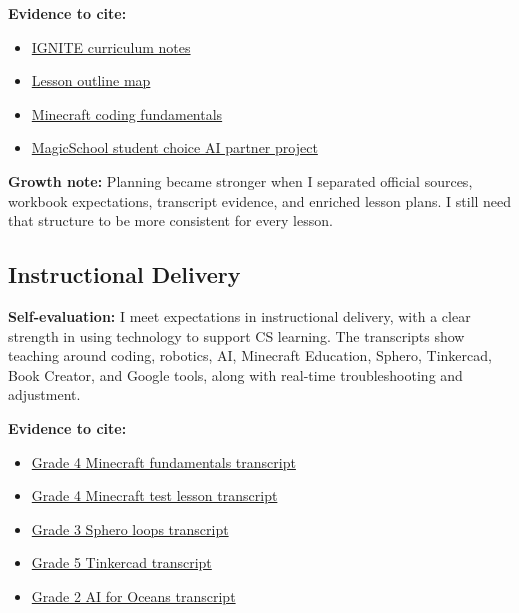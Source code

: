 \documentclass[10pt]{article}
\newcommand{\doclink}[2]{\href{run:#1}{#2}}
\begin{document}
\textbf{Evidence to cite:}
\begin{itemize}[leftmargin=*]
  \item \doclink{../../pine-brook-elementary/teaching-placement-ignite-curriculum-gcsd-25-26/teaching-placement-ignite-curriculum-gcsd-25-26-notes.md}{IGNITE curriculum notes}
  \item \doclink{../../pine-brook-elementary/lessons/lesson-outline-notes.md}{Lesson outline map}
  \item \doclink{../../pine-brook-elementary/lessons/grade-4-baris-fowler-schrank-autore/minecraft-coding-fundamentals/minecraft-coding-fundamentals.md}{Minecraft coding fundamentals}
  \item \doclink{../../pine-brook-elementary/lessons/grade-3-lamanaco-lallucci-regelsberger-tandoi/magicschool-student-choice-ai-partner-project/magicschool-student-choice-ai-partner-project.md}{MagicSchool student choice AI partner project}
\end{itemize}

\textbf{Growth note:} Planning became stronger when I separated official sources, workbook expectations, transcript evidence, and enriched lesson plans. I still need that structure to be more consistent for every lesson.

\subsection{Instructional Delivery}

\textbf{Self-evaluation:} I meet expectations in instructional delivery, with a clear strength in using technology to support CS learning. The transcripts show teaching around coding, robotics, AI, Minecraft Education, Sphero, Tinkercad, Book Creator, and Google tools, along with real-time troubleshooting and adjustment.

\textbf{Evidence to cite:}
\begin{itemize}[leftmargin=*]
  \item \doclink{../../transcripts/grade-4/260313-grade-4-baris-minecraft-fundamentals.md}{Grade 4 Minecraft fundamentals transcript}
  \item \doclink{../../transcripts/grade-4/260302-grade-4-baris-minecraft-test.md}{Grade 4 Minecraft test lesson transcript}
  \item \doclink{../../transcripts/grade-3/260227-grade-3-lamanaco-sphero-loops.md}{Grade 3 Sphero loops transcript}
  \item \doclink{../../transcripts/grade-5/260304-grade-5-pickett-tinkercad.md}{Grade 5 Tinkercad transcript}
  \item \doclink{../../transcripts/grade-2/260211-grade-2-callon-ai-oceans.md}{Grade 2 AI for Oceans transcript}
\end{itemize}
\end{document}
